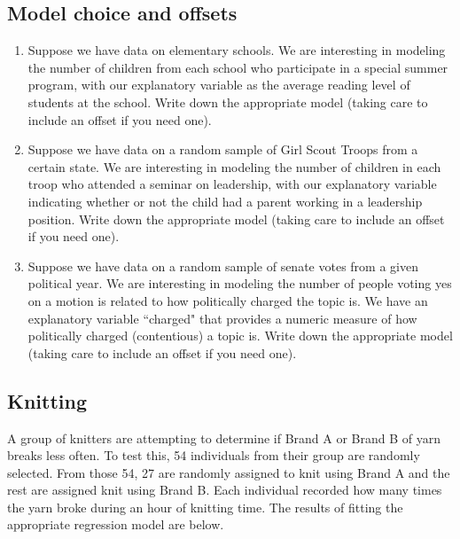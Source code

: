 \documentclass[11pt]{article}
\begin{document}
\subsection{Model choice and offsets}

\begin{enumerate}
\item Suppose we have data on elementary schools. We are interesting in modeling the number of children from each school who participate in a special summer program, with our explanatory variable as the average reading level of students at the school. Write down the appropriate model (taking care to include an offset if you need one). 

\vspace{3cm} 

\item Suppose we have data on a random sample of Girl Scout Troops from a certain state. We are interesting in modeling the number of children in each troop who attended a seminar on leadership, with our explanatory variable indicating whether or not the child had a parent working in a leadership position. Write down the appropriate model (taking care to include an offset if you need one).

\vspace{3cm} 
 

\item Suppose we have data on a random sample of senate votes from a given political year. We are interesting in modeling the number of people voting yes on a motion is related to how politically charged the topic is. We have an explanatory variable ``charged" that provides a numeric measure of how politically charged (contentious) a topic is. Write down the appropriate model (taking care to include an offset if you need one).

\end{enumerate}

\newpage


\subsection{Knitting}

A group of knitters are attempting to determine if Brand A or Brand B of yarn breaks less often. To test this, 54 individuals from their group are randomly selected. From those 54, 27 are randomly assigned to knit using Brand A and the rest are assigned knit using Brand B. Each individual recorded how many times the yarn broke during an hour of knitting time. The results of fitting the appropriate regression model are below.  
\end{document}
